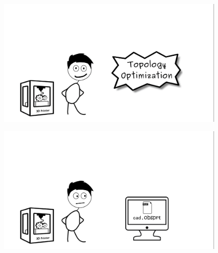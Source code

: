 
\begin{frame}
\begin{figure}

\vspace{-1cm}	
\hspace{-4cm}		\includegraphics[width=1\linewidth]{Pictures/animations/animation_1.png}
		\end{figure}

\end{frame}

\begin{frame}
\begin{figure}
			\includegraphics[width=1.4\linewidth]{Pictures/animations/animation_2.png}
		\end{figure}

\end{frame}


